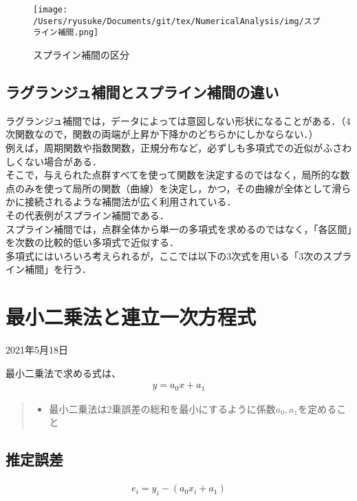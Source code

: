 \documentclass[dvipdfmx,uplatex]{jsarticle}
\begin{document}
\begin{spacing}{1.4}
\begin{figure}[htbp]
\begin{center}
\texttt{[image: /Users/ryusuke/Documents/git/tex/NumericalAnalysis/img/スプライン補間.png]}
\caption{スプライン補間の区分}
\end{center}
\end{figure}

\subsection{ラグランジュ補間とスプライン補間の違い}
ラグランジュ補間では，データによっては意図しない形状になることがある．（4次関数なので，関数の両端が上昇か下降かのどちらかにしかならない．）\\
例えば，周期関数や指数関数，正規分布など，必ずしも多項式での近似がふさわしくない場合がある．\\
そこで，与えられた点群すべてを使って関数を決定するのではなく，局所的な数点のみを使って局所の関数（曲線）を決定し，かつ，その曲線が全体として滑らかに接続されるような補間法が広く利用されている．\\
その代表例がスプライン補間である．\\
スプライン補間では，点群全体から単一の多項式を求めるのではなく，「各区間」を次数の比較的低い多項式で近似する．\\
多項式にはいろいろ考えられるが，ここでは以下の3次式を用いる「3次のスプライン補間」を行う．

\newpage

\section{最小二乗法と連立一次方程式}
\begin{center}
  2021年5月18日 \\
\end{center}
最小二乗法で求める式は、
\begin{eqnarray}
  y = a_0x + a_1
\end{eqnarray}

\begin{quote}
 \begin{itemize}
  \item 最小二乗法は2乗誤差の総和を最小にするように係数$a_0, a_1$を定めること
 \end{itemize}
\end{quote}

\subsection{推定誤差}
\begin{eqnarray}
  e_i = y_i - (a_0x_i + a_1)
\end{eqnarray}


\end{spacing}
\end{document}
